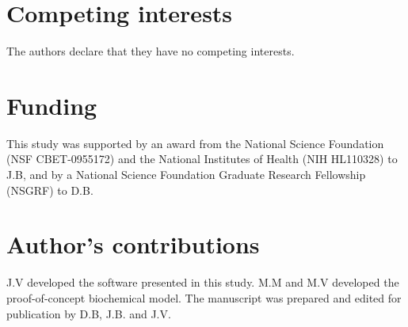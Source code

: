 \documentclass{bmcart}
\begin{document}
\begin{backmatter}

\section*{Competing interests}
  The authors declare that they have no competing interests.

\section*{Funding}
This study was supported by an award from the National Science Foundation (NSF CBET-0955172) and the National Institutes of Health (NIH HL110328) to J.B, and by
a National Science Foundation Graduate Research Fellowship (NSGRF) to D.B.

\section*{Author's contributions}
    J.V developed the software presented in this study. M.M and M.V developed the proof-of-concept biochemical model.
    The manuscript was prepared and edited for publication by D.B, J.B. and J.V.




\end{backmatter}
\end{document}
